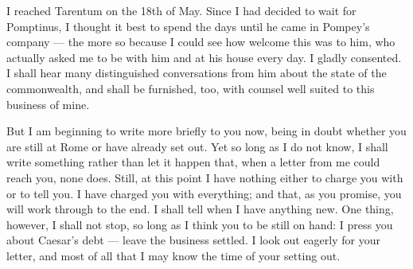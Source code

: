

 I reached Tarentum on the 18th of May. Since I had decided to wait for Pomptinus, I thought it best to spend the days until he came in Pompey's company --- the more so because I could see how welcome this was to him, who actually asked me to be with him and at his house every day. I gladly consented. I shall hear many distinguished conversations from him about the state of the commonwealth, and shall be furnished, too, with counsel well suited to this business of mine.

 But I am beginning to write more briefly to you now, being in doubt whether you are still at Rome or have already set out. Yet so long as I do not know, I shall write something rather than let it happen that, when a letter from me could reach you, none does. Still, at this point I have nothing either to charge you with or to tell you. I have charged you with everything; and that, as you promise, you will work through to the end. I shall tell when I have anything new. One thing, however, I shall not stop, so long as I think you to be still on hand: I press you about Caesar's debt --- leave the business settled. I look out eagerly for your letter, and most of all that I may know the time of your setting out.
